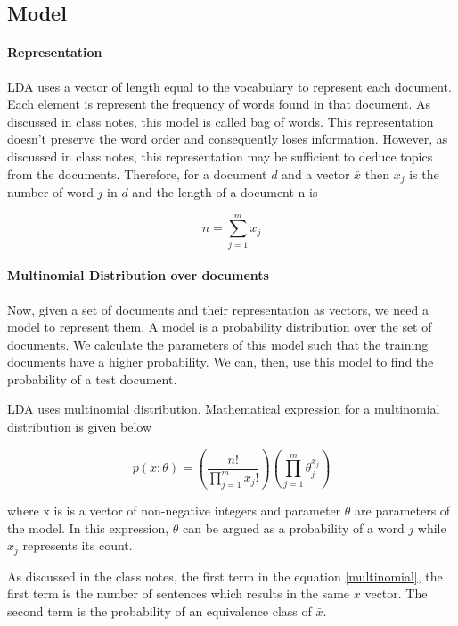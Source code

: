 \documentclass[11pt,a4paper,oneside]{article}
\begin{document}
\subsection{Model}
\paragraph{Representation}
LDA uses a vector of length equal to the vocabulary to represent each document. Each element is represent the frequency of words found in that document. As discussed in class notes, this model is called bag of words. This representation doesn't preserve the word order and consequently loses information. However, as discussed in class notes, this representation may be sufficient to deduce topics from the documents. Therefore, for a document $d$ and a vector $\bar{x}$ then $x_j$ is the number of word $j$ in $d$ and the length of a document n is

\begin{equation}
	n = \sum^{m}_{j=1}x_j
\end{equation}

\paragraph{Multinomial Distribution over documents}
Now, given a set of documents and their representation as vectors, we need a model to represent them. A model is a probability distribution over the set of documents. We calculate the parameters of this model such that the training documents have a higher probability. We can, then, use this model to find the probability of a test document.

LDA uses multinomial distribution. Mathematical expression for a multinomial distribution is given below

\begin{equation}\label{multinomial}
p(x;\theta) = (\frac{n!}{\prod^m_{j=1}x_j!})(\prod^m_{j=1}\theta^{x_j}_j)
\end{equation}

where x is is a vector of non-negative integers and parameter $\theta$ are parameters of the model. In this expression, $\theta$ can be argued as a probability of a word $j$ while $x_j$ represents its count.

As discussed in the class notes, the first term in the equation \ref{multinomial}, the first term is the number of sentences which results in the same $x$ vector. The second term is the probability of an equivalence class of $\bar{x}$.
\end{document}
